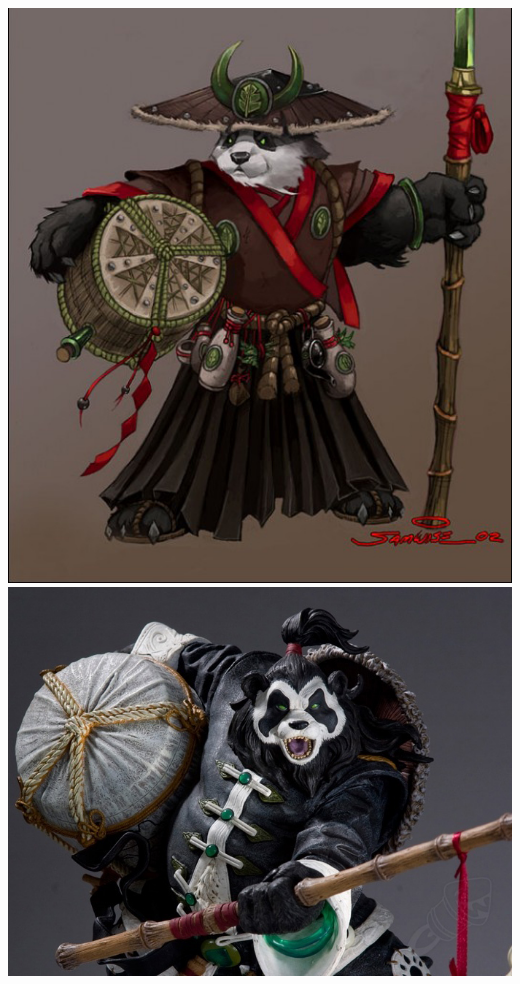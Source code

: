 \begin{center}
	\includegraphics[width=0.39\linewidth]{img/WoW/chen.jpg} \includegraphics[width=0.575\linewidth]{img/WoW/153930.jpg}
\end{center}

